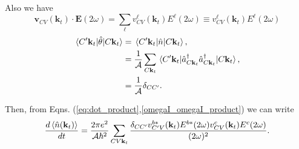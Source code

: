 \documentclass{article}
\newcommand{\kt}{\mathbf{k}_{t}}
\newcommand{\Op}{\hat{\mathcal{\theta}}}
\newcommand{\n}{\hat{n}(\kt)}
\begin{document}
Also we have
\begin{equation}\label{eq:dot_product}
\mathbf{v}_{CV}(\kt) \cdot \mathbf{E}(2\omega)
= \sum_{\ell} v^{\ell}_{CV}(\kt) E^{\ell}(2\omega) \equiv v^{\ell}_{CV}(\kt)
E^{\ell}(2\omega) 
\end{equation}
\begin{align}
\mel*{C'\kt}{\Op}{C\kt} 
&= \mel*{C'\kt}{\hat{n}}{C\kt} , \nonumber \\
&= \frac{1}{\mathcal{A}} \sum_{C\kt} 
\mel*{C'\kt}{\hat{a}^{\dag}_{C\kt} \hat{a}^{\dag}_{C\kt}}{C\kt} , \nonumber \\
&= \frac{1}{\mathcal{A}} \delta_{CC'} .
\end{align}

Then, from Eqns. (\ref{eq:dot_product},\ref{omegaI_omegaI_product}) we can write
\begin{equation*}
\frac{d\ev*{\n}}{dt} = \frac{2\pi e^{2}}{\mathcal{A}\hbar^{2}} \sum_{CV\kt}
\frac{\delta_{CC'}v^{b*}_{C'V}(\kt)E^{b*}(2\omega)v^{c}_{CV}(\kt)E^{c}(2\omega)}{(2\omega)^{2}}.
\end{equation*}



\end{document}
